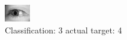 \begin{figure}[h!]
\begin{center}
\includegraphics[width=0.60\columnwidth]{figures/ID3136_class_3_target_4.png}
\end{center}
\caption{ Classification: 3 actual target: 4}
\label{fig:ID3136_class_3_target_4}
\end{figure}
